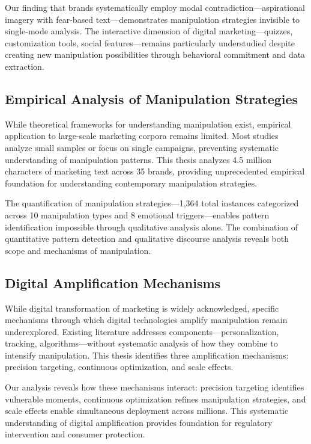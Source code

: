 Our finding that brands systematically employ modal contradiction—aspirational imagery with fear-based text—demonstrates manipulation strategies invisible to single-mode analysis. The interactive dimension of digital marketing—quizzes, customization tools, social features—remains particularly understudied despite creating new manipulation possibilities through behavioral commitment and data extraction.

\subsection{Empirical Analysis of Manipulation Strategies}

While theoretical frameworks for understanding manipulation exist, empirical application to large-scale marketing corpora remains limited. Most studies analyze small samples or focus on single campaigns, preventing systematic understanding of manipulation patterns. This thesis analyzes 4.5 million characters of marketing text across 35 brands, providing unprecedented empirical foundation for understanding contemporary manipulation strategies.

The quantification of manipulation strategies—1,364 total instances categorized across 10 manipulation types and 8 emotional triggers—enables pattern identification impossible through qualitative analysis alone. The combination of quantitative pattern detection and qualitative discourse analysis reveals both scope and mechanisms of manipulation.

\subsection{Digital Amplification Mechanisms}

While digital transformation of marketing is widely acknowledged, specific mechanisms through which digital technologies amplify manipulation remain underexplored. Existing literature addresses components—personalization, tracking, algorithms—without systematic analysis of how they combine to intensify manipulation. This thesis identifies three amplification mechanisms: precision targeting, continuous optimization, and scale effects.

Our analysis reveals how these mechanisms interact: precision targeting identifies vulnerable moments, continuous optimization refines manipulation strategies, and scale effects enable simultaneous deployment across millions. This systematic understanding of digital amplification provides foundation for regulatory intervention and consumer protection.

